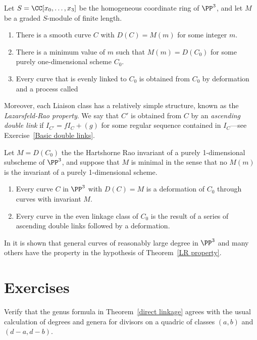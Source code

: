 \begin{fact}
\begin{theorem}
Let $S = \CC[x_0, \dots, x_3]$ be the homogeneous coordinate ring of $\PP^3$, and let $M$ be a graded $S$-module of finite length.
\begin{enumerate}
\item There is a smooth curve $C$ with $D(C) = M(m)$ for some integer $m$.
\item There is a minimum value of $m$ such that $M(m) = D(C_0)$ for some purely one-dimensional scheme $C_0$.
\item Every curve that is evenly linked to $C_0$ is obtained from $C_0$ by deformation and a process called
\end{enumerate}
\end{theorem}

Moreover, each Liaison class has a relatively simple structure, known as the \emph{Lazarsfeld-Rao property}.
We say that $C'$ is obtained from $C$ by an \emph{ascending double link} if $I_{C'} = fI_C+(g)$ for some regular sequence
contained in $I_C$---see Exercise~\ref{Basic double links}. 

\begin{theorem}\cite{MR1087803}\label{LR property}
Let $M = D(C_0)$ the the Hartshorne Rao invariant of a purely 1-dimensional subscheme of $\PP^3$, and suppose that
$M$ is minimal in the sense that no $M(m)$ is the invariant of a purely 1-dimensional scheme. 
\begin{enumerate}
 \item Every curve $C$ in $\PP^3$ with $D(C) = M$ is a deformation of $C_0$ through curves with invariant $M$.
 \item Every curve in the even linkage class of $C_0$ is the result of a series of ascending double links followed by a deformation.
\end{enumerate}
\end{theorem}

In \cite{MR714753} it is shown that general curves of reasonably large degree in $\PP^3$ and many others have the property in the hypothesis
of  Theorem~\ref{LR property}.
\end{fact}


\section{Exercises}

\begin{exercise}
 Verify that the genus formula in Theorem~\ref{direct linkage} agrees with the usual calculation of degrees and genera for divisors on a quadric of
 classes $(a,b)$ and $(d-a, d-b)$.
\end{exercise}

